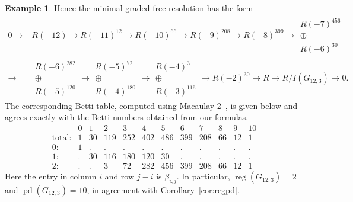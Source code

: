 \documentclass[12pt,reqno]{amsart}
\theoremstyle{definition}
\newtheorem{example}[theorem]{Example}
\numberwithin{equation}{section}
\def\C{\mathcal{C}}
\newcommand{\pd}{\operatorname{pd}}
\newcommand{\reg}{\operatorname{reg}}
\begin{document}
\begin{example}
	
	Hence the minimal graded free resolution has the form
\[
\begin{aligned}
	0\longrightarrow&
	R(-12)
	\longrightarrow R(-11)^{12}
	\longrightarrow R(-10)^{66}
	\longrightarrow R(-9)^{208}
	\longrightarrow R(-8)^{399}
	\longrightarrow
	\substack{
		R(-7)^{456}\\
		\oplus\\
		R(-6)^{30}
	}\\
	\longrightarrow	&
	\substack{
		R(-6)^{282}\\
		\oplus\\
		R(-5)^{120}
	}
	\longrightarrow
	\substack{
		R(-5)^{72}\\
		\oplus\\
		R(-4)^{180}
	}
	\longrightarrow
	\substack{
		R(-4)^3\\
		\oplus\\
		R(-3)^{116}
	}
	\longrightarrow
	R(-2)^{30}
	\longrightarrow R
	\longrightarrow R/I(G_{12,3})
	\longrightarrow0.
\end{aligned}
\]
The corresponding Betti table, computed using Macaulay-2~\cite{M2}, is
given below and agrees exactly with the Betti numbers obtained from our
formulas.
\[
\begin{array}{c|rrrrrrrrrrr}
	&0&1&2&3&4&5&6&7&8&9&10\\
	\hline
	\text{total:}
	&1&30&119&252&402&486&399&208&66&12&1\\
	0:
	&1&.&.&.&.&.&.&.&.&.&.\\
	1:
	&.&30&116&180&120&30&.&.&.&.&.\\
	2:
	&.&.&3&72&282&456&399&208&66&12&1
\end{array}
\]
Here the entry in column $i$ and row $j-i$ is $\beta_{i,j}$. In
particular, $\reg(G_{12,3})=2$ and $\pd(G_{12,3})=10$, in agreement
with Corollary~\ref{cor:regpd}.
\end{example}


%
%
\end{document}
